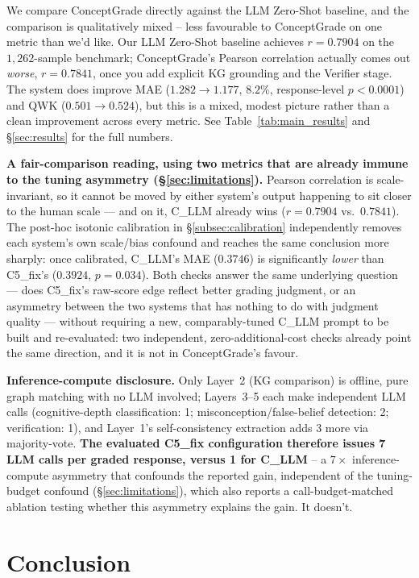 \documentclass[conference]{IEEEtran}
\begin{document}
We compare ConceptGrade directly against the LLM Zero-Shot baseline,
and the comparison is qualitatively mixed -- less favourable to
ConceptGrade on one metric than we'd like. Our LLM Zero-Shot baseline
achieves $r=0.7904$ on the $1{,}262$-sample benchmark; ConceptGrade's
Pearson correlation actually comes out \emph{worse}, $r=0.7841$, once
you add explicit KG grounding and the Verifier stage. The system does
improve MAE ($1.282\to1.177$, $8.2\%$, response-level $p<0.0001$) and
QWK ($0.501\to0.524$), but this is a mixed, modest picture rather than
a clean improvement across every metric. See Table~\ref{tab:main_results}
and \S\ref{sec:results} for the full numbers.

\textbf{A fair-comparison reading, using two metrics that are already
immune to the tuning asymmetry (\S\ref{sec:limitations}).} Pearson
correlation is scale-invariant, so it cannot be moved by either
system's output happening to sit closer to the human scale --- and on
it, C\_LLM already wins ($r=0.7904$ vs.\ $0.7841$). The post-hoc
isotonic calibration in \S\ref{subsec:calibration} independently
removes each system's own scale/bias confound and reaches the same
conclusion more sharply: once calibrated, C\_LLM's MAE ($0.3746$) is
significantly \emph{lower} than C5\_fix's ($0.3924$, $p=0.034$).
Both checks answer the same underlying question --- does C5\_fix's
raw-score edge reflect better grading judgment, or an asymmetry
between the two systems that has nothing to do with judgment quality
--- without requiring a new, comparably-tuned C\_LLM prompt to be
built and re-evaluated: two independent, zero-additional-cost checks
already point the same direction, and it is not in ConceptGrade's
favour.

\textbf{Inference-compute disclosure.} Only Layer~2 (KG comparison) is
offline, pure graph matching with no LLM involved; Layers~3--5 each
make independent LLM calls (cognitive-depth classification: 1;
misconception/false-belief detection: 2; verification: 1), and
Layer~1's self-consistency extraction adds 3 more via majority-vote.
\textbf{The evaluated C5\_fix configuration therefore issues 7 LLM
calls per graded response, versus 1 for C\_LLM} -- a $7\times$
inference-compute asymmetry that confounds the reported gain,
independent of the tuning-budget confound (\S\ref{sec:limitations}),
which also reports a call-budget-matched ablation testing whether this
asymmetry explains the gain. It doesn't.

\section{Conclusion}
\end{document}
